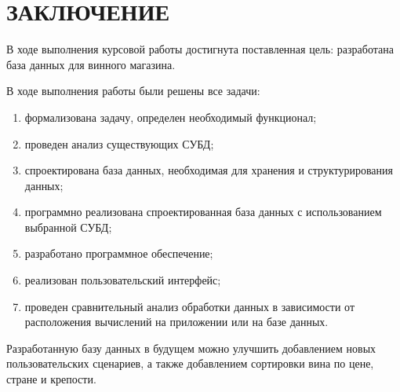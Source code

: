 \chapter*{ЗАКЛЮЧЕНИЕ}
В ходе выполнения курсовой работы достигнута поставленная цель: разработана база данных для винного магазина.

В ходе выполнения работы были решены все задачи:
\begin{enumerate}[label=\arabic*)]
	\item формализована задачу, определен необходимый функционал;
	\item проведен анализ существующих СУБД;
	\item спроектирована база данных, необходимая для хранения и структурирования данных;
	\item программно реализована спроектированная база данных с использованием выбранной СУБД;
        \item разработано программное обеспечение;
	\item реализован пользовательский интерфейс;
        \item проведен сравнительный анализ обработки данных в зависимости от расположения вычислений на приложении или на базе данных.
\end{enumerate} 

Разработанную базу данных в будущем можно улучшить добавлением новых пользовательских сценариев, а также добавлением сортировки вина по цене, стране и крепости.
